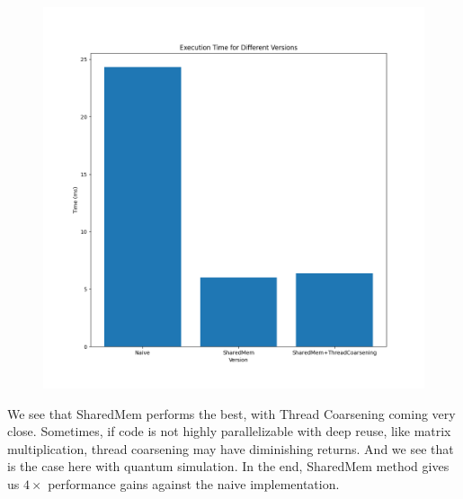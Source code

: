 \documentclass{article}
\begin{document}
\begin{figure}[H]
	\centerline{\includegraphics[width=6in]{figures/quantum_time.png}}
\end{figure}

We see that SharedMem performs the best, with Thread Coarsening coming very close. Sometimes, if code is not highly parallelizable with deep reuse, like matrix multiplication, thread coarsening may have diminishing returns. And we see that is the case here with quantum simulation. In the end, SharedMem method gives us $4\times$ performance gains against the naive implementation.



\end{document}
